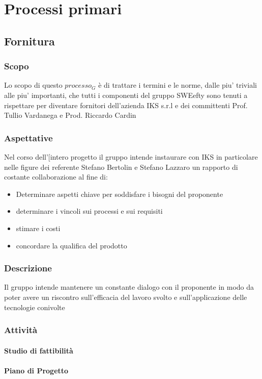 \section{Processi primari}

\subsection{Fornitura}
	
	\subsubsection{Scopo}
		Lo scopo di questo $processo_G$ è di trattare i termini e le norme, dalle piu' triviali alle piu' importanti, che tutti i componenti del gruppo SWEefty sono tenuti a rispettare per diventare fornitori dell'azienda IKS s.r.l e dei committenti Prof. Tullio Vardanega e Prod. Riccardo Cardin
	\subsubsection{Aspettative}
	Nel corso dell'[intero progetto il gruppo intende instaurare con IKS in particolare nelle figure dei referente Stefano Bertolin e Stefano Lazzaro un rapporto di costante collaborazione al fine di:
	\begin{itemize}
	\item Determinare aspetti chiave per soddisfare i bisogni del proponente
	\item determinare i vincoli sui processi e sui requisiti
	\item stimare i costi 
	\item concordare la qualifica del prodotto
	\end{itemize}
	\subsubsection{Descrizione}
	Il gruppo intende mantenere un constante dialogo con il proponente in modo da poter avere un riscontro sull'efficacia del lavoro svolto e sull'applicazione delle tecnologie conivolte
	\subsubsection{Attività}
		\paragraph{Studio di fattibilità}
		\paragraph{Piano di Progetto}
